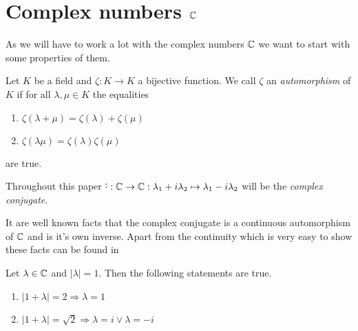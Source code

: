 \section{Complex numbers $\mathbb{C}$}

As we will have to work a lot with the complex numbers $\mathbb{C}$ we want to start with some properties of them. 

\begin{definition}
	Let $K$ be a field and $\zeta: K \to K$ a bijective function. We call $\zeta$ an \textit{automorphism} of $K$ if for all $\lambda, \mu \in K$ the equalities
	\begin{enumerate}
		\item $\zeta(\lambda + \mu) = \zeta(\lambda) + \zeta(\mu)$
		\item $\zeta(\lambda \mu) = \zeta(\lambda) \zeta(\mu)$
	\end{enumerate}
	are true.
	
\end{definition}

\begin{definition}
	Throughout this paper $\overline{\cdot}: \mathbb{C} \to \mathbb{C}: \lambda_1 + i \lambda_2 \mapsto \lambda_1 - i \lambda_2$ will be the \textit{complex conjugate}.
\end{definition}

It are well known facts that the complex conjugate is a continuous automorphism of $\mathbb{C}$ and is it's own inverse. Apart from the continuity which is very easy to show these facts can be found in \cite[p.40]{LinAG1&2} 	

\begin{lemma} \label{lemma:complex_geom}
	Let $\lambda \in \mathbb{C}$ and $|\lambda| = 1$. Then the following statements are true.
	\begin{enumerate}
		\item $|1 + \lambda| = 2 \Rightarrow \lambda = 1$
		\item $|1 + \lambda| = \sqrt{2} \Rightarrow \lambda = i \lor \lambda = -i$
	\end{enumerate}
\end{lemma}

